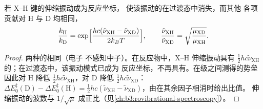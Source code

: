 \begin{proposition}[一级动力学同位素效应的最大值]\label{prop:b3:rate-theories:primary-kie}
若 X--H 键的伸缩振动成为反应坐标，
使该振动的在过渡态中消失，而其他
各项贡献对 H 与 D 均相同，
\[
  \frac{k_{\mathrm H}}{k_{\mathrm D}} = \exp\Bigl[\frac{hc(\tilde\nu_{\mathrm{XH}} - \tilde\nu_{\mathrm{XD}})}{2k_BT}\Bigr],
  \qquad \frac{\tilde\nu_{\mathrm{XH}}}{\tilde\nu_{\mathrm{XD}}} = \sqrt{\frac{\mu_{\mathrm{XD}}}{\mu_{\mathrm{XH}}}} .
\]
\end{proposition}

\begin{proof}
两种的相同（电子
不感知中子）。在反应物中，X--H 伸缩振动具有
$\frac12hc\tilde\nu_{\mathrm{XH}}$ 的；在过渡态中，该振动模式已成为
反应坐标，不再具有。在级之间测得的势垒
因此对 H 降低 $\frac12hc\tilde\nu_{\mathrm{XH}}$，对 D 降低 $\frac12hc\tilde\nu_{\mathrm{XD}}$：$\Delta E_0^{\ddagger}(\mathrm D) -
\Delta E_0^{\ddagger}(\mathrm H) = \frac12hc(\tilde\nu_{\mathrm{XH}} - \tilde\nu_{\mathrm{XD}})$，由在其余因子相消时给出比值。
伸缩振动的波数与
$1/\sqrt\mu$ 成正比（见\cref{ch:b3:rovibrational-spectroscopy}）。
\end{proof}


